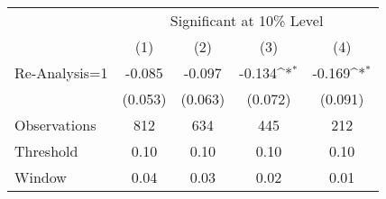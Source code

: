 {
\def\sym#1{\ifmmode^{#1}\else\(^{#1}\)\fi}
\begin{tabular}{l*{4}{c}}
\hline\hline
                    &\multicolumn{4}{c}{Significant at 10\% Level}                                          \\
                    &\multicolumn{1}{c}{(1)}         &\multicolumn{1}{c}{(2)}         &\multicolumn{1}{c}{(3)}         &\multicolumn{1}{c}{(4)}         \\
\hline
Re-Analysis=1       &      -0.085         &      -0.097         &      -0.134\sym{*}  &      -0.169\sym{*}  \\
                    &     (0.053)         &     (0.063)         &     (0.072)         &     (0.091)         \\
\hline
Observations        &         812         &         634         &         445         &         212         \\
Threshold           &        0.10         &        0.10         &        0.10         &        0.10         \\
Window              &        0.04         &        0.03         &        0.02         &        0.01         \\
\hline\hline
\end{tabular}
}
